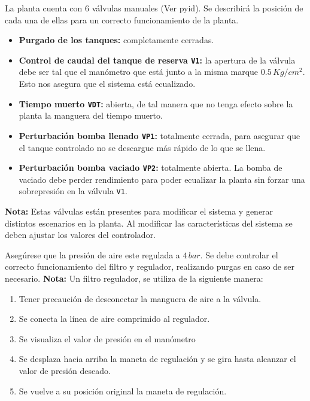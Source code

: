 \begin{tcolorbox}[title=Válvulas manuales, breakable]
La planta cuenta con 6 válvulas manuales (Ver \gls{pyid}).
Se describirá la posición de cada una
de ellas para un correcto funcionamiento de la planta.
 
 \begin{itemize}
  \item \textbf{Purgado de los tanques:} completamente cerradas.
  \item \textbf{Control de caudal del tanque de reserva \texttt{V1}:}
  la apertura de la válvula debe ser tal que el manómetro que está junto
  a la misma marque $0.5\,{Kg}/{cm^2}$. Esto nos asegura que el sistema está
  ecualizado.
  \item \textbf{Tiempo muerto \texttt{VDT}:} abierta, de tal manera que no
tenga efecto sobre la  planta la manguera del tiempo muerto.
  \item \textbf{Perturbación bomba llenado \texttt{VP1}:} totalmente cerrada,
para asegurar que el tanque controlado no se descargue más rápido de lo que se
llena.
  \item \textbf{Perturbación bomba vaciado \texttt{VP2}:} totalmente abierta.
  La bomba de vaciado debe perder rendimiento para poder ecualizar la planta
sin forzar una sobrepresión en la válvula \texttt{V1}.
 \end{itemize}
 \tcblower
 \textbf{Nota:} Estas válvulas están presentes para modificar el sistema y 
generar distintos
escenarios en la planta. Al modificar las características del sistema se deben
ajustar los valores del controlador.
\end {tcolorbox}

\begin{tcolorbox}[title=Presión de aire]
  Asegúrese que la presión de aire este regulada a $4\,bar$. Se debe controlar
  el correcto funcionamiento del filtro y regulador, realizando purgas en caso
de ser necesario.
 \tcblower
  \textbf{Nota:} Un filtro regulador, se utiliza de la siguiente manera:
 \begin{enumerate}
    \item Tener precaución de desconectar la manguera de aire a la válvula.
    \item Se conecta la línea de aire comprimido al regulador.
    \item Se visualiza el valor de presión en el manómetro
    \item Se desplaza hacia arriba la maneta de regulación y se gira hasta
      alcanzar el valor de presión deseado.
    \item Se vuelve a su posición original la maneta de regulación.
 \end{enumerate}
\end {tcolorbox}

